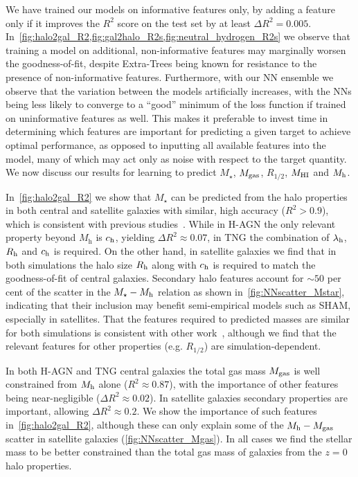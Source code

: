 \documentclass[useAMS,usenatbib]{mnras}
\begin{document}
We have trained our models on informative features only, by adding a feature only if it improves the $R^2$ score on the test set by at least $\Delta R^2 = 0.005$. In~\cref{fig:halo2gal_R2,fig:gal2halo_R2s,fig:neutral_hydrogen_R2s} we observe that training a model on additional, non-informative features may marginally worsen the goodness-of-fit, despite Extra-Trees being known for resistance to the presence of non-informative features. Furthermore, with our NN ensemble we observe that the variation between  the models artificially increases, with the NNs being less likely to converge to a ``good'' minimum of the loss function if trained on uninformative features as well. This makes it preferable to invest time in determining which features are important for predicting a given target to achieve optimal performance, as opposed to inputting all available features into the model, many of which may act only as noise with respect to the target quantity. We now discuss our results for learning to predict $M_\star$, $M_{\rm gas}$, $R_{1/2}$, $M_{\rm HI}$ and $M_{\rm h}$.

In~\cref{fig:halo2gal_R2} we show that $M_\star$ can be predicted from the halo properties in both central and satellite galaxies with similar, high accuracy ($R^2 > 0.9$), which is consistent with previous studies~\citep{Kamdar_2016,de_Santi_2022,Lovell_2021,Chen_2021}. While in H-AGN the only relevant property beyond $M_\text{h}$ is $c_{\rm h}$, yielding $\Delta R^2 \approx 0.07$, in TNG the combination of $\lambda_{\rm h}$, $R_{\rm h}$ and $c_{\rm h}$ is required. On the other hand, in satellite galaxies we find that in both simulations the halo size $R_{\rm h}$ along with $c_{\rm h}$ is required to match the goodness-of-fit of central galaxies. Secondary halo features account for $\sim50$ per cent of the scatter in the $M_\star - M_{\rm h}$ relation as shown in~\cref{fig:NNscatter_Mstar}, indicating that their inclusion may benefit semi-empirical models such as SHAM, especially in satellites. That the features required to predicted masses are similar for both simulations is consistent with other work~\citep{Villaescusa_Navarro_2021,Chen_2021}, although we find that the relevant features for other properties (e.g. $R_{1/2}$) are simulation-dependent.

In both H-AGN and TNG central galaxies the total gas mass $M_{\rm gas}$ is well constrained from $M_{\rm h}$ alone ($R^2\approx0.87$), with the importance of other features being near-negligible ($\Delta R^2\approx0.02$). In satellite galaxies secondary properties are important, allowing $\Delta R^2 \approx0.2$. We show the importance of such features in~\cref{fig:halo2gal_R2}, although these can only explain some of the $M_{\rm h}-M_{\rm gas}$ scatter in satellite galaxies (\cref{fig:NNscatter_Mgas}). In all cases we find the stellar mass to be better constrained than the total gas mass of galaxies from the $z=0$ halo properties.
\end{document}
